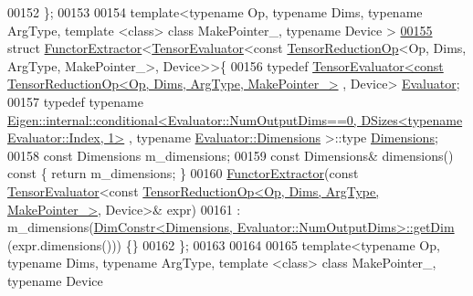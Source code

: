 \begin{DoxyCode}
00152 \};
00153 
00154 \textcolor{keyword}{template}<\textcolor{keyword}{typename} Op, \textcolor{keyword}{typename} Dims, \textcolor{keyword}{typename} ArgType, \textcolor{keyword}{template} <\textcolor{keyword}{class}> \textcolor{keyword}{class }MakePointer\_, \textcolor{keyword}{typename} Device
      >
\hyperlink{struct_eigen_1_1_tensor_sycl_1_1internal_1_1_functor_extractor_3_01_tensor_evaluator_3_01const_08e46bb7792b8f07bb791a4ece83b9c3b}{00155} \textcolor{keyword}{struct }\hyperlink{struct_eigen_1_1_tensor_sycl_1_1internal_1_1_functor_extractor}{FunctorExtractor}<\hyperlink{struct_eigen_1_1_tensor_evaluator}{TensorEvaluator}<const 
      \hyperlink{class_eigen_1_1_tensor_reduction_op}{TensorReductionOp}<Op, Dims, ArgType, MakePointer\_>, Device>>\{
00156   \textcolor{keyword}{typedef} 
      \hyperlink{struct_eigen_1_1_tensor_evaluator}{TensorEvaluator<const TensorReductionOp<Op, Dims, ArgType, MakePointer\_>}
      , Device> \hyperlink{struct_eigen_1_1_tensor_evaluator_3_01const_01_tensor_reduction_op_3_01_op_00_01_dims_00_01_arg_4fdf2ec1445de4704eb590bc98040dc6}{Evaluator};
00157   \textcolor{keyword}{typedef} \textcolor{keyword}{typename} 
      \hyperlink{struct_eigen_1_1internal_1_1conditional}{Eigen::internal::conditional<Evaluator::NumOutputDims==0, DSizes<typename Evaluator::Index, 1>}
      , \textcolor{keyword}{typename} \hyperlink{class_eigen_1_1internal_1_1_tensor_lazy_evaluator_writable}{Evaluator::Dimensions} >::type \hyperlink{class_eigen_1_1internal_1_1_tensor_lazy_evaluator_writable}{Dimensions};
00158   \textcolor{keyword}{const} Dimensions m\_dimensions;
00159   \textcolor{keyword}{const} Dimensions& dimensions()\textcolor{keyword}{ const }\{ \textcolor{keywordflow}{return} m\_dimensions; \}
00160   \hyperlink{struct_eigen_1_1_tensor_sycl_1_1internal_1_1_functor_extractor}{FunctorExtractor}(\textcolor{keyword}{const} \hyperlink{struct_eigen_1_1_tensor_evaluator}{TensorEvaluator}<\textcolor{keyword}{const} 
      \hyperlink{class_eigen_1_1_tensor_reduction_op}{TensorReductionOp<Op, Dims, ArgType, MakePointer\_>}, 
      Device>& expr)
00161   : m\_dimensions(\hyperlink{struct_eigen_1_1_tensor_sycl_1_1internal_1_1_dim_constr}{DimConstr<Dimensions, Evaluator::NumOutputDims>::getDim}
      (expr.dimensions())) \{\}
00162 \};
00163 
00164 
00165 \textcolor{keyword}{template}<\textcolor{keyword}{typename} Op, \textcolor{keyword}{typename} Dims, \textcolor{keyword}{typename} ArgType, \textcolor{keyword}{template} <\textcolor{keyword}{class}> \textcolor{keyword}{class }MakePointer\_, \textcolor{keyword}{typename} Device

\end{DoxyCode}
